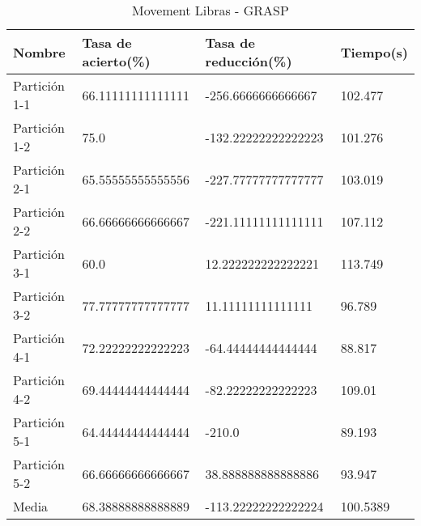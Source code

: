 \begin{table}[H]
	\centering
	\begin{tabular}{l|lll}
		Nombre        & Tasa de acierto(\%) & Tasa de reducción(\%) & Tiempo(s) \\ \hline
		Partición 1-1 & 66.11111111111111   & -256.6666666666667    & 102.477   \\
		Partición 1-2 & 75.0                & -132.22222222222223   & 101.276   \\
		Partición 2-1 & 65.55555555555556   & -227.77777777777777   & 103.019   \\
		Partición 2-2 & 66.66666666666667   & -221.11111111111111   & 107.112   \\
		Partición 3-1 & 60.0                & 12.222222222222221    & 113.749   \\
		Partición 3-2 & 77.77777777777777   & 11.11111111111111     & 96.789    \\
		Partición 4-1 & 72.22222222222223   & -64.44444444444444    & 88.817    \\
		Partición 4-2 & 69.44444444444444   & -82.22222222222223    & 109.01    \\
		Partición 5-1 & 64.44444444444444   & -210.0                & 89.193    \\
		Partición 5-2 & 66.66666666666667   & 38.888888888888886    & 93.947    \\ \hline
		Media         & 68.38888888888889   & -113.22222222222224   & 100.5389 
	\end{tabular}
	\caption{Movement Libras - GRASP}
	\label{MLIB-GRASP}
\end{table}